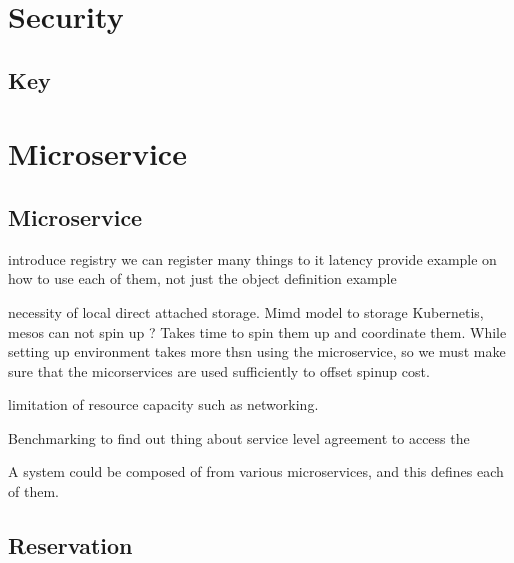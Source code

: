 \documentclass[9pt,twocolumn,twoside]{styles/osajnl}
\begin{document}
\section{Security}

\subsection{Key}


\section{Microservice}

\subsection{Microservice}

 
introduce registry we can register many things to it 
latency 
provide example on how to use each of them, not just the object definition example 
 
necessity of local direct attached storage. 
Mimd model to storage  
Kubernetis, mesos can not spin up ?  
Takes time to spin them up and coordinate them. While setting up environment takes more thsn using the microservice, so we must make sure that the micorservices are used sufficiently to offset spinup cost. 
 
limitation of resource capacity such as networking. 
 
Benchmarking to find out thing about service level agreement to access
the 


A system could be composed of from various microservices, and this defines
each of them.



\subsection{Reservation}
\end{document}

